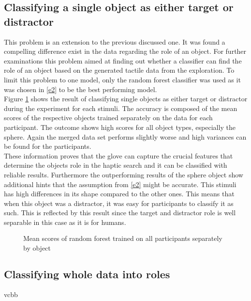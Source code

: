 \subsection{Classifying a single object as either target or distractor}
This problem is an extension to the previous discussed one. It was found a compelling difference exist in the data regarding the role of an object. For further examinations this problem aimed at finding out whether a classifier can find the role of an object based on the generated tactile data from the exploration. To limit this problem to one model, only the random forest classifier was used as it was chosen in \ref{e2} to be the best performing model. \\
Figure \ref{tnt} shows the result of classifying single objects as either target or distractor during the experiment for each stimuli. The accuracy is composed of the mean scores of the respective objects trained separately on the data for each participant. The outcome shows high scores for all object types, especially the sphere. Again the merged data set performs slightly worse and high variances can be found for the participants.\\
These information proves that the glove can capture the crucial features that determine the objects role in the haptic search and it can be classified with reliable results. Furthermore the outperforming results of the sphere object show additional hints that the assumption from \ref{e2} might be accurate. This stimuli has high differences in its shape compared to the other ones. This means that when this object was a distractor, it was easy for participants to classify it as such. This is reflected by this result since the target and distractor role is well separable in this case as it is for humans. 

\begin{figure}[H]
	\caption{Mean scores of random forest trained on all participants separately by object}
	\label{tnt}
\end{figure}

\subsection{Classifying whole data into roles}
vcbb